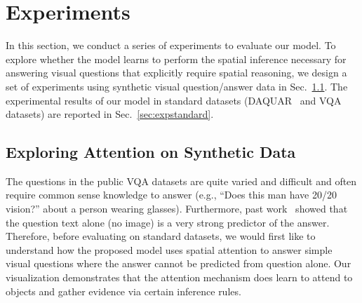 \section{Experiments}
\vspace{-0.05in}

In this section, we conduct a series of experiments to evaluate our model. 
To explore whether the model learns to perform the spatial inference necessary for answering visual questions that explicitly require spatial reasoning, we design a set of experiments using synthetic visual question/answer data in Sec.~\ref{sec:synthetic1}. The experimental results of our model in standard datasets (DAQUAR~\cite{DBLP:journals/corr/MalinowskiF14} and VQA~\cite{DBLP:journals/corr/AntolALMBZP15} datasets) are reported in Sec.~\ref{sec:expstandard}.

\subsection{Exploring Attention on Synthetic Data}\label{sec:synthetic1}
The questions in the public VQA datasets are quite varied and difficult and often require common sense knowledge to answer (e.g., ``Does this man have 20/20 vision?'' about a person wearing glasses). Furthermore, past work~\cite{malinowski2015ask,DBLP:journals/corr/RenKZ15} showed that the question text alone (no image) is a very strong predictor of the answer.
Therefore, before evaluating on standard datasets, we would first like to
understand how the proposed model uses spatial attention to answer simple visual questions where the answer cannot be predicted from question alone. 
Our visualization demonstrates that the attention mechanism does learn to attend to objects and gather evidence via certain inference rules. 

